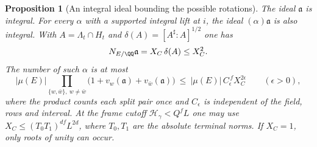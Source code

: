 \documentclass[a4paper,11pt]{article}
\newtheorem{proposition}{Proposition}[section]
\theoremstyle{definition}
\theoremstyle{remark}
\numberwithin{equation}{section}
\begin{document}
\begin{proposition}[An integral ideal bounding the possible rotations]
\leavevmode\label{prop:rotationideal611}
The ideal \(\mathfrak a\) is integral. For every \(\alpha\) with
a supported integral lift at \(i\), the ideal
\((\alpha)\mathfrak a\) is also integral. With
\(A=\Lambda_t\cap H_t\) and \(\delta(A)=[A^\sharp:A]^{1/2}\)
one has
\[
             N_{E/\QQ}\mathfrak a=X_C\,\delta(A)\le X_C^2 .
\]
The number of such \(\alpha\) is at most
\begin{equation}
   |\mu(E)|\prod_{\{w,\bar w\},\ w\ne\bar w}
       \bigl(1+v_w(\mathfrak a)+v_{\bar w}(\mathfrak a)\bigr)
       \ \le\ |\mu(E)|\,C_\epsilon^{\,f}X_C^{2\epsilon}
       \qquad(\epsilon>0),
 \label{eq:rotationcount611}
\end{equation}
where the product counts each split pair once and \(C_\epsilon\)
is independent of the field, rows and interval. At the frame
cutoff \(\mathcal H_\gamma<Q^f L\) one may use
\(X_C\le(T_0T_1)^{df}L^{2d}\), where \(T_0,T_1\) are the
absolute terminal norms. If \(X_C=1\), only roots of unity can
occur.
\end{proposition}
\end{document}
